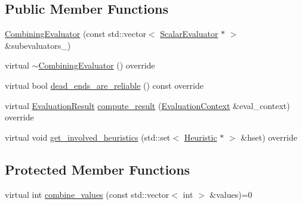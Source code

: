\subsection*{Public Member Functions}
\begin{DoxyCompactItemize}
\item 
\hyperlink{classCombiningEvaluator_ab0d3e60b90a84ca1f6bba21670ea4268}{Combining\-Evaluator} (const std\-::vector$<$ \hyperlink{classScalarEvaluator}{Scalar\-Evaluator} $\ast$ $>$ \&subevaluators\-\_\-)
\item 
virtual \hyperlink{classCombiningEvaluator_a2cfc4161494028950a1d46be718701aa}{$\sim$\-Combining\-Evaluator} () override
\item 
virtual bool \hyperlink{classCombiningEvaluator_a72f61f835e02b716d02734a65b1c7d99}{dead\-\_\-ends\-\_\-are\-\_\-reliable} () const override
\item 
virtual \hyperlink{classEvaluationResult}{Evaluation\-Result} \hyperlink{classCombiningEvaluator_a9da792d602f409634bea4ceb32421369}{compute\-\_\-result} (\hyperlink{classEvaluationContext}{Evaluation\-Context} \&eval\-\_\-context) override
\item 
virtual void \hyperlink{classCombiningEvaluator_acaba3e4f6375cba36fedbefe5a9bdea1}{get\-\_\-involved\-\_\-heuristics} (std\-::set$<$ \hyperlink{classHeuristic}{Heuristic} $\ast$ $>$ \&hset) override
\end{DoxyCompactItemize}
\subsection*{Protected Member Functions}
\begin{DoxyCompactItemize}
\item 
virtual int \hyperlink{classCombiningEvaluator_ae88080950f68d03c5b9e7c96cddfd7a9}{combine\-\_\-values} (const std\-::vector$<$ int $>$ \&values)=0
\end{DoxyCompactItemize}


